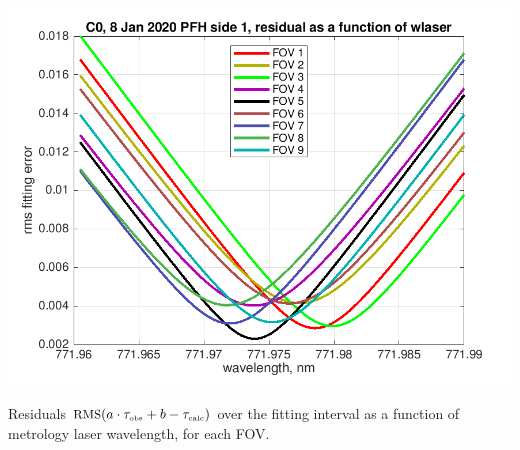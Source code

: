 \documentclass[10pt]{beamer}
\begin{document}
\begin{frame}
\begin{columns}[t]
\begin{column}{0.5\textwidth}
  \begin{centering}
  \includegraphics[width=\textwidth]{01-08_pfl_s1_CO/CO_wlaser_fit.png}
  \end{centering}\vspace{3mm}

Residuals $\mbox{\small RMS}(a\cdot\tau_{\mbox{\tiny obs}} + b - \tau_{\mbox{\tiny calc}})$ over the fitting
interval as a function of metrology laser wavelength, for each FOV.

\end{column}
\end{columns}
\end{frame}
\end{document}
